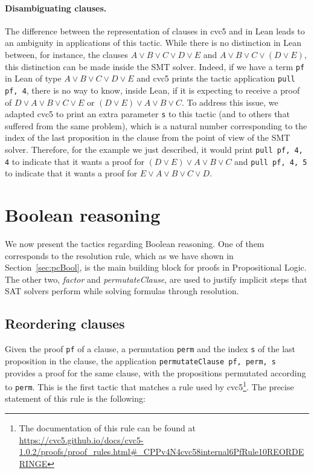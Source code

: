 \paragraph{Disambiguating clauses.} The difference between the representation of
clauses in cvc5 and in Lean leads to an ambiguity in applications of this tactic.
While there is no distinction in Lean between, for instance, the clauses $A \vee B \vee C \vee D \vee E$
and $A \vee B \vee C \vee (D \vee E)$, this distinction can be made inside the SMT solver. Indeed, if
we have a term \texttt{pf} in Lean of type $A \vee B \vee C \vee D \vee E$ and cvc5 prints the tactic
application \texttt{pull pf, 4}, there is no way to know, inside Lean, if it is expecting to receive
a proof of $D \vee A \vee B \vee C \vee E$ or $(D \vee E) \vee A \vee B \vee C$. To address this issue,
we adapted cvc5 to print an extra parameter \texttt{s} to this tactic (and to others that suffered from the same problem),
which is a natural number corresponding to the index of the last proposition in the clause from the
point of view of the SMT solver. Therefore, for the example we just described, it would print
\texttt{pull pf, 4, 4} to indicate that it wants a proof for $(D \vee E) \vee A \vee B \vee C$ and
\texttt{pull pf, 4, 5} to indicate that it wants a proof for $E \vee A \vee B \vee C \vee D$.

\section{Boolean reasoning}

We now present the tactics regarding Boolean reasoning. One of them corresponds to
the resolution rule, which as we have shown in Section~\ref{sec:pcBool}, is the main
building block for proofs in Propositional Logic. The other two, \textit{factor} and
\textit{permutateClause}, are used to justify implicit steps that SAT solvers
perform while solving formulas through resolution.

\subsection{Reordering clauses}

Given the proof \texttt{pf} of a clause, a permutation \texttt{perm} and the index \texttt{s} of the last
proposition in the clause, the application \texttt{permutateClause pf, perm, s} provides a proof for the same clause, with
the propositions permutated according to \texttt{perm}.
This is the first tactic that matches a rule used by cvc5\footnote{The documentation of this rule can be found at \url{https://cvc5.github.io/docs/cvc5-1.0.2/proofs/proof\_rules.html\#\_CPPv4N4cvc58internal6PfRule10REORDERINGE}}. The precise statement
of this rule is the following:

